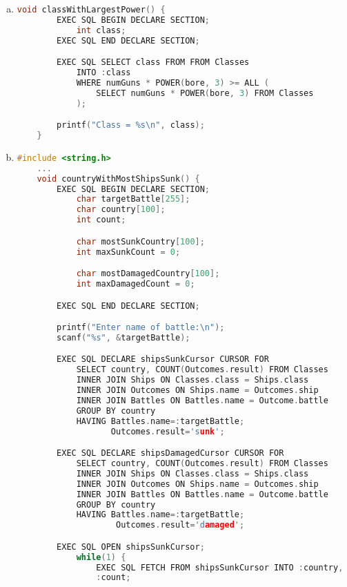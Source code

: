\documentclass[12pt]{article}
\begin{document}
\begin{enumerate}[1.]
    \begin{enumerate}[a)]
        \item

    \begin{lstlisting}[language=c]
    void classWithLargestPower() {
        EXEC SQL BEGIN DECLARE SECTION;
            int class;
        EXEC SQL END DECLARE SECTION;

        EXEC SQL SELECT class FROM FROM Classes
            INTO :class
            WHERE numGuns * POWER(bore, 3) >= ALL (
                SELECT numGuns * POWER(bore, 3) FROM Classes
            );

        printf("Class = %s\n", class);
    }
    \end{lstlisting}

        \item

    \begin{lstlisting}[language=c]
    #include <string.h>
    ...
    void countryWithMostShipsSunk() {
        EXEC SQL BEGIN DECLARE SECTION;
            char targetBattle[255];
            char country[100];
            int count;

            char mostSunkCountry[100];
            int maxSunkCount = 0;

            char mostDamagedCountry[100];
            int maxDamagedCount = 0;

        EXEC SQL END DECLARE SECTION;

        printf("Enter name of battle:\n");
        scanf("%s", &targetBattle);

        EXEC SQL DECLARE shipsSunkCursor CURSOR FOR
            SELECT country, COUNT(Outcomes.result) FROM Classes
            INNER JOIN Ships ON Classes.class = Ships.class
            INNER JOIN Outcomes ON Ships.name = Outcomes.ship
            INNER JOIN Battles ON Battles.name = Outcome.battle
            GROUP BY country
            HAVING Battles.name=:targetBattle;
                   Outcomes.result='sunk';

        EXEC SQL DECLARE shipsDamagedCursor CURSOR FOR
            SELECT country, COUNT(Outcomes.result) FROM Classes
            INNER JOIN Ships ON Classes.class = Ships.class
            INNER JOIN Outcomes ON Ships.name = Outcomes.ship
            INNER JOIN Battles ON Battles.name = Outcome.battle
            GROUP BY country
            HAVING Battles.name=:targetBattle;
                    Outcomes.result='damaged';

        EXEC SQL OPEN shipsSunkCursor;
            while(1) {
                EXEC SQL FETCH FROM shipsSunkCursor INTO :country,
                :count;


\end{lstlisting}
\end{enumerate}
\end{enumerate}
\end{document}
